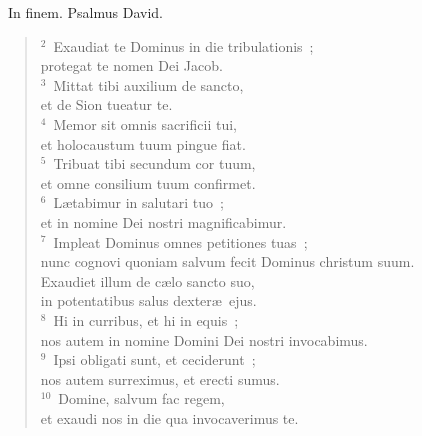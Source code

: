 ~\lettrine[lines=10,image=true,loversize=0.05,lraise=-0.03]{I}{}n finem. Psalmus David.
\begin{flushleft}\begin{verse}\vspace{6pt}${}^{2}$~Exaudiat te Dominus in die tribulationis~;\\ protegat te nomen Dei Jacob.\\
${}^{3}$~Mittat tibi auxilium de sancto,\\ et de Sion tueatur te.\\
${}^{4}$~Memor sit omnis sacrificii tui,\\ et holocaustum tuum pingue fiat.\\
${}^{5}$~Tribuat tibi secundum cor tuum,\\ et omne consilium tuum confirmet.\\
${}^{6}$~L\ae tabimur in salutari tuo~;\\ et in nomine Dei nostri magnificabimur.\\
${}^{7}$~Impleat Dominus omnes petitiones tuas~;\\ nunc cognovi quoniam salvum fecit Dominus christum suum.\\ Exaudiet illum de c\ae lo sancto suo,\\ in potentatibus salus dexter\ae\ ejus.\\
${}^{8}$~Hi in curribus, et hi in equis~;\\ nos autem in nomine Domini Dei nostri invocabimus.\\
${}^{9}$~Ipsi obligati sunt, et ceciderunt~;\\ nos autem surreximus, et erecti sumus.\\
${}^{10}$~Domine, salvum fac regem,\\ et exaudi nos in die qua invocaverimus te.\end{verse}\end{flushleft}


